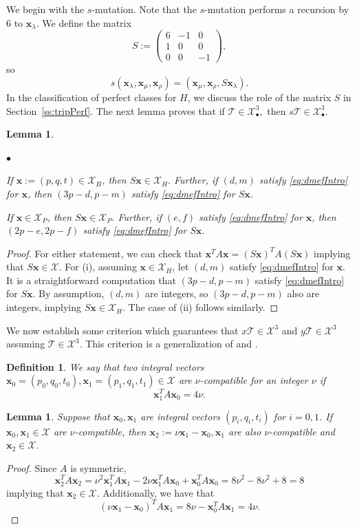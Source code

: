 \documentclass[11pt, reqno]{amsart}
\newtheorem{lemma}[thm]{Lemma}
\newtheorem{definition}[thm]{Definition}
\theoremstyle{remark}
\numberwithin{equation}{subsection}
\numberwithin{figure}{section}
\theoremstyle{customremark}
\newcommand{\Tt}{\mathcal{T}}
\newenvironment{itemlist}
   { \begin{list} {$\bullet$}
         { \setlength{\topsep}{.5ex}  \setlength{\itemsep}{.5ex} \setlength{\leftmargin}{2.5ex} } }
   { \end{list} }
\newcommand{\la}{{\lambda}}
\newcommand{\X}{\mathcal{X}}
\begin{document}
We begin with the $s$-mutation. Note that the $s$-mutation performs a recursion by $6$ to $\bm{x}_\la.$ We define the matrix
\[S:=\begin{pmatrix}
    6 & -1 & 0 \\ 1 & 0 & 0 \\ 0 & 0 & -1
\end{pmatrix},\]
so \[s(\bm{x}_\la,\bm{x}_\mu,\bm{x}_\rho)=(\bm{x}_\mu,\bm{x}_\rho,S\bm{x}_\la).\] In the classification of perfect classes for $H$, we discuss the role of the matrix $S$ in Section~\ref{ss:tripPerf}.
The next lemma proves that if $\Tt \in \X_\bullet^3,$ then $s\Tt \in \X_\bullet^3.$
\begin{lemma} \label{lem:symTriple} \begin{itemlist}
    \item[{(i)}] If $\bm{x}:=(p,q,t) \in\X_H$, then $S\bm{x} \in\X_H.$ Further, if $(d,m)$ satisfy \eqref{eq:dmefIntro} for $\bm{x}$, then $(3p-d,p-m)$ satisfy \eqref{eq:dmefIntro} for $S\bm{x}$.
    \item[{(ii)}] If $\bm{x} \in\X_P$, then $S\bm{x} \in\X_P.$ Further, if $(e,f)$ satisfy \eqref{eq:dmefIntro} for $\bm{x}$, then $(2p-e,2p-f)$ satisfy \eqref{eq:dmefIntro} for $S\bm{x}$. 
\end{itemlist}
\end{lemma}
\begin{proof}
For either statement, we can check that $\bm{x}^TA\bm{x}=(S\bm{x})^TA(S\bm{x})$ implying that $S\bm{x} \in\X$. 
For (i), assuming $\bm{x}\in\X_H$, let $(d,m)$ satisfy \eqref{eq:dmefIntro} for $\bm{x}$.  It is a straightforward computation that $(3p-d,p-m)$ satisfy \eqref{eq:dmefIntro} for $S\bm{x}$. By assumption, $(d,m)$ are integers, so $(3p-d,p-m)$ also are integers, implying $S\bm{x} \in\X_H$. 
The case of (ii) follows similarly. 
\end{proof}

We now establish some criterion which guarantees that $x\Tt \in \X^3$ and $y\Tt \in \X^3$ assuming $\Tt \in \X^3$. This criterion is a generalization of \cite[Section 3.1]{MM} and \cite[Section 2.1]{MMW}. 



\begin{definition}
    We say that two integral vectors $\bm{x}_0=(p_0,q_0,t_0),\bm{x}_1=(p_1,q_1,t_1) \in \X$ 
    are $\nu$-compatible for an integer $\nu$ if 
    \[ \bm{x}_1^TA\bm{x}_0=4\nu.\]  
\end{definition}

\begin{lemma}\cite[Lem 3.1.2]{MM}
    Suppose that $\bm{x}_0,\bm{x}_1$ are integral vectors $(p_i,q_i,t_i)$ for $i=0,1$. If $\bm{x}_0,\bm{x}_1 \in \mathcal{X}$ are $\nu$-compatible, 
         then $\bm{x}_2:=\nu \bm{x}_1-\bm{x}_0,\bm{x}_1$ are also $\nu$-compatible and $\bm{x}_2 \in\X.$  
\end{lemma}
\begin{proof}
    Since $A$ is symmetric, \[\bm{x}_2^TA\bm{x}_2=\nu^2\bm{x}_1^TA\bm{x}_1-2\nu \bm{x}_1^TA\bm{x}_0+\bm{x}_0^TA\bm{x}_0=8\nu^2-8\nu^2+8=8\]
    implying that $\bm{x}_2 \in\X.$ Additionally, we have that
    \[ (\nu \bm{x}_1-\bm{x}_0)^TA\bm{x}_1=8\nu-\bm{x}_0^TA\bm{x}_1=4\nu.\]
\end{proof}
\end{document}
